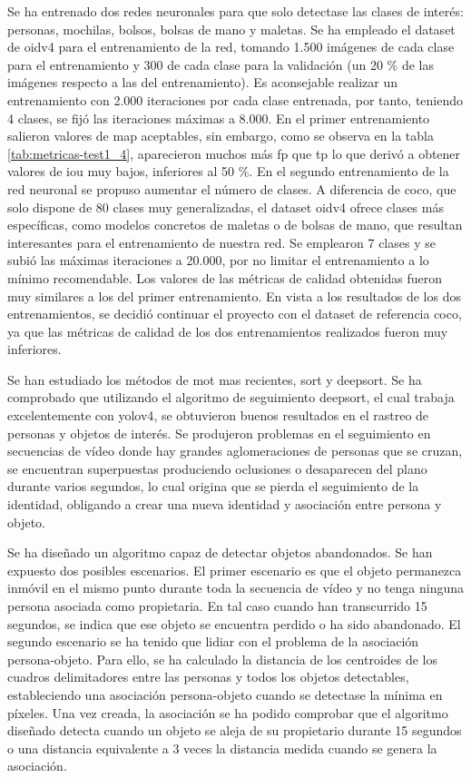 Se ha entrenado dos redes neuronales para que solo detectase las clases de interés: personas, mochilas, bolsos, bolsas de mano y maletas. Se ha empleado el dataset de \gls{oidv4} para el entrenamiento de la red, tomando 1.500 imágenes de cada clase para el entrenamiento y 300 de cada clase para la validación (un 20 \% de las imágenes respecto a las del entrenamiento). Es aconsejable realizar un entrenamiento con 2.000 iteraciones por cada clase entrenada, por tanto, teniendo 4 clases, se fijó las iteraciones máximas a 8.000. En el primer entrenamiento salieron valores de \gls{map} aceptables, sin embargo, como se observa en la tabla \ref{tab:metricas-test1_4}, aparecieron muchos más \gls{fp} que \gls{tp} lo que derivó a obtener valores de \gls{iou} muy bajos, inferiores al 50 \%. En el segundo entrenamiento de la red neuronal se propuso aumentar el número de clases. A diferencia de \gls{coco}, que solo dispone de 80 clases muy generalizadas, el dataset \gls{oidv4} ofrece clases más específicas, como modelos concretos de maletas o de bolsas de mano, que resultan interesantes para el entrenamiento de nuestra red. Se emplearon 7 clases y se subió las máximas iteraciones a 20.000, por no limitar el entrenamiento a lo mínimo recomendable. Los valores de las métricas de calidad obtenidas fueron muy similares a los del primer entrenamiento. En vista a los resultados de los dos entrenamientos, se decidió continuar el proyecto con el dataset de referencia \gls{coco}, ya que las métricas de calidad de los dos entrenamientos realizados fueron muy inferiores.

Se han estudiado los métodos de \gls{mot} mas recientes, \gls{sort} y \gls{deepsort}. Se ha comprobado que utilizando el algoritmo de seguimiento \gls{deepsort}, el cual trabaja excelentemente con \gls{yolov4}, se obtuvieron buenos resultados en el rastreo de personas y objetos de interés. Se produjeron problemas en el seguimiento en secuencias de vídeo donde hay grandes aglomeraciones de personas que se cruzan, se encuentran superpuestas produciendo oclusiones o desaparecen del plano durante varios segundos, lo cual origina que se pierda el seguimiento de la identidad, obligando a crear una nueva identidad y asociación entre persona y objeto.

Se ha diseñado un algoritmo capaz de detectar objetos abandonados. Se han expuesto dos posibles escenarios. El primer escenario es que el objeto permanezca inmóvil en el mismo punto durante toda la secuencia de vídeo y no tenga ninguna persona asociada como propietaria. En tal caso cuando han transcurrido 15 segundos, se indica que ese objeto se encuentra perdido o ha sido abandonado. El segundo escenario se ha tenido que lidiar con el problema de la asociación persona-objeto. Para ello, se ha calculado la distancia de los centroides de los cuadros delimitadores entre las personas y todos los objetos detectables, estableciendo una asociación persona-objeto cuando se detectase la mínima en píxeles. Una vez creada, la asociación se ha podido comprobar que el algoritmo diseñado detecta cuando un objeto se aleja de su propietario durante 15 segundos o una distancia equivalente a 3 veces la distancia medida cuando se genera la asociación.

